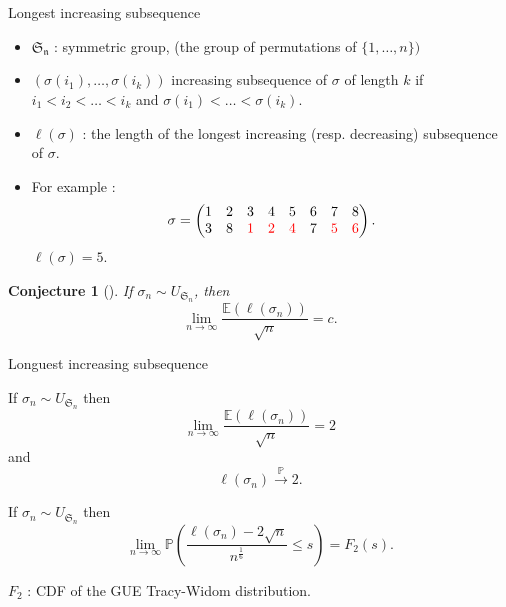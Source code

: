 \documentclass[english]{beamer}
\newtheorem{conjecture}[theorem]{Conjecture}
\begin{document}
\begin{frame}{Longest increasing subsequence}
\begin{itemize}

\item $\mathfrak{S_n}$ : symmetric group, (the  group of permutations of $\{1,\dots,n\})$
\\ 
\item $(\sigma(i_1),\dots,\sigma(i_k))$  increasing  subsequence of $\sigma$ of length $k$ if $i_1<i_2<\dots<i_k$ and $\sigma(i_1)<\dots<\sigma(i_k)$.
\item $\ell(\sigma)$ : the length of the longest increasing (resp. decreasing) subsequence of $\sigma$.
\item For example : $$\sigma = \begin{pmatrix} 
1 & 2 & 3 & 4 & 5 & 6 & 7 & 8 \\
3 & 8 & \color{red} 1 &\color{red} 2 &\color{red} 4 & 7 &\color{red} 5 &\color{red} 6
  \end{pmatrix}.$$
$\ell(\sigma)=5$.
\end{itemize}
    \begin{conjecture}[\cite{ulam}]
    If $\sigma_n \sim {U}_{\mathfrak{S}_n}$, then
    $$\lim_{n\to \infty}\frac{\mathbb{E}(\ell(\sigma_n))}{\sqrt{n}}=c.$$ 
    \end{conjecture}
\end{frame}

\begin{frame}{Longuest increasing subsequence}
\begin{theorem}
  If $\sigma_n \sim {U}_{\mathfrak{S}_n}$ then
    $$\lim_{n\to \infty}\frac{\mathbb{E}(\ell(\sigma_n))}{\sqrt{n}}=2$$
    and
    $$ \ell(\sigma_n) \overset{\mathbb{P}}\to 2.$$ 
\end{theorem}
\begin{theorem}  \label{dbj}
 If $\sigma_n \sim {U}_{\mathfrak{S}_n}$ then
\begin{equation*} 
\lim_{n \to \infty} \mathbb{P}\left(\frac{\ell(\sigma_n)-2\sqrt{n}}{n^\frac 16}\leq s\right)=F_2(s).
\end{equation*}
\end{theorem}
    $F_2$ : CDF of the GUE Tracy-Widom distribution. 
\end{frame}
\end{document}
